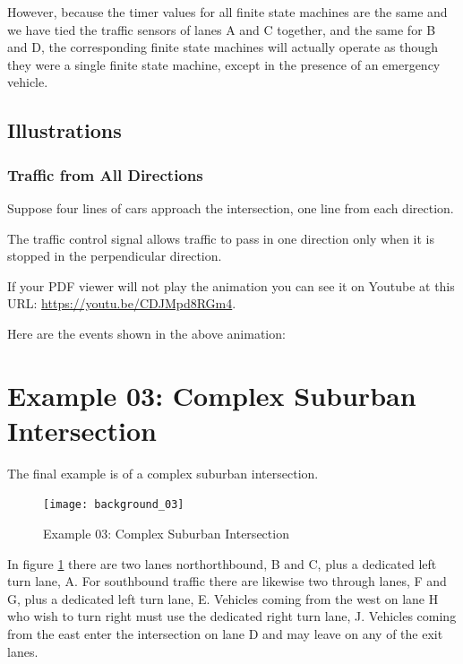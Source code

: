 \documentclass[letterpaper,twoside]{article}
\begin{document}
However, because the timer values for all finite state machines are the same
and we have tied the traffic sensors of lanes A and C
together, and the same for B and D, the corresponding finite state machines
will actually operate as though they were a single finite state machine,
except in the presence of an emergency vehicle.

\subsection{Illustrations}

\subsubsection{Traffic from All Directions}

Suppose four lines of cars approach the intersection, one
line from each direction.

\noindent{}

The traffic control signal allows traffic to pass in one direction
only when it is stopped in the perpendicular direction.

If your PDF viewer will not play the animation you can see it on Youtube
at this URL:
\href{https://youtu.be/CDJMpd8RGm4}{https://youtu.be/CDJMpd8RGm4}.

Here are the events shown in the above animation:



\section{Example 03: Complex Suburban Intersection}

The final example is of a complex suburban intersection.

\begin{figure}[htb]
  {\texttt{[image: background\_03]}}
  {\caption{Example 03: Complex Suburban Intersection}
    \label{fig:complex_intersection}}
\end{figure}

In figure \ref{fig:complex_intersection} there are two lanes
northorthbound, B and C, plus a dedicated left turn lane, A.
For southbound traffic there are likewise two through lanes,
F and G, plus a dedicated left turn lane, E.
Vehicles coming from the west on lane H who wish to turn right
must use the dedicated right turn lane, J.  Vehicles coming
from the east enter the intersection on lane D and may leave
on any of the exit lanes.
\end{document}

